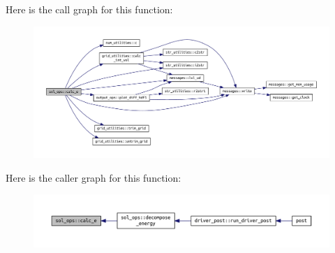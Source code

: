 Here is the call graph for this function\+:\nopagebreak
\begin{figure}[H]
\begin{center}
\leavevmode
\includegraphics[width=350pt]{namespacesol__ops_ae094c2a5235324b4aadb53623978d191_cgraph}
\end{center}
\end{figure}
Here is the caller graph for this function\+:\nopagebreak
\begin{figure}[H]
\begin{center}
\leavevmode
\includegraphics[width=350pt]{namespacesol__ops_ae094c2a5235324b4aadb53623978d191_icgraph}
\end{center}
\end{figure}
\mbox{\label{namespacesol__ops_aee487ffbe5d0edff5e37a6500748941c}} 
